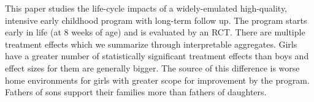\noindent This paper studies the life-cycle impacts of a widely-emulated high-quality, intensive early childhood program with long-term follow up. The program starts early in life (at 8 weeks of age) and is evaluated by an RCT. There are multiple treatment effects which we summarize through interpretable aggregates. Girls have a greater number of statistically significant treatment effects than boys and effect sizes for them are generally bigger. The source of this difference is worse home environments for girls with greater scope for improvement by the program. Fathers of sons support their families more than fathers of daughters.
